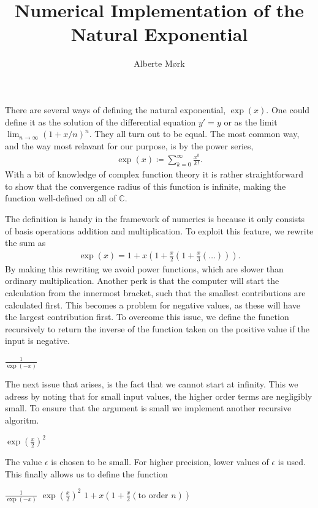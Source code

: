 \documentclass{article}
\title{Numerical Implementation of the Natural Exponential}
\author{Alberte Mørk}
\date{}
\begin{document}
\maketitle

There are several ways of defining the natural exponential, $\exp(x)$. One could define it as the solution of the differential equation $y' = y$ or as the limit $\lim_{n \rightarrow \infty} (1 + x/n)^n$. They all turn out to be equal. The most common way, and the way most relavant for our purpose, is by the power series, 
%
\begin{align*}
	\exp (x) \coloneqq \sum_{k = 0}^\infty \frac{x^k}{k!}.
\end{align*}
%
With a bit of knowledge of complex function theory it is rather straightforward to show that the convergence radius of this function is infinite, making the function well-defined on all of $\mathbb{C}$. 

The definition is handy in the framework of numerics is because it only consists of basis operations addition and multiplication. To exploit this feature, we rewrite the sum as
%
\begin{align*}
	\exp (x) = 1 + x \left( 1 + \frac{x}{2} \left( 1 + \frac{x}{3} \left( \dots \right) \right) \right).
\end{align*}
%
By making this rewriting we avoid power functions, which are slower than ordinary multiplication. Another perk is that the computer will start the calculation from the innermost bracket, such that the smallest contributions are calculated first. This becomes a problem for negative values, as these will have the largest contribution first. To overcome this issue, we define the function recursively to return the inverse of the function taken on the positive value if the input is negative. 
%
\begin{algorithmic}
	\Return $\frac{1}{\exp(-x)}$
	\EndIf
\end{algorithmic}

The next issue that arises, is the fact that we cannot start at infinity. This we adress by noting that for small input values, the higher order terms are negligibly small. To ensure that the argument is small we implement another recursive algoritm. 
%
\begin{algorithmic}
	\Return $\exp \left( \frac{x}{2} \right)^2$
	\EndIf
\end{algorithmic}
%
The value $\epsilon$ is chosen to be small. For higher precision, lower values of $\epsilon$ is used. This finally allows us to define the function 
%
\begin{algorithmic}
	\Return $\frac{1}{\exp(-x)}$
	\EndIf
	\Return $\exp \left( \frac{x}{2} \right)^2$
	\EndIf
	\Return $1 + x\left( 1 + \frac{x}{2} \left( \text{to order } n \right) \right)$
	\EndFunction
\end{algorithmic}
\end{document}
